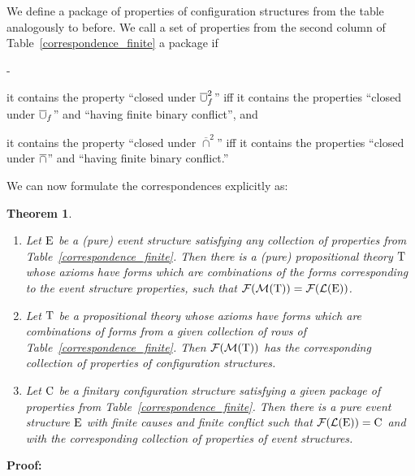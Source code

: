 \documentclass[twocolumn]{article}
\newtheorem{theo}{Theorem}
\newenvironment{theorem}[1]{\begin{theo} \rm \label{th-#1} }{\end{theo}}
\newenvironment{itemise2}{\begin{list}{{\bf --}}{\leftmargin 15pt
                        \labelwidth\leftmargini\advance\labelwidth-\labelsep
                        \topsep 2pt \itemsep 1pt \parsep 1pt}}{\end{list}}
\newcommand{\bbsmallcap}{\overline{\cap}^2}
\newcommand{\pf}{{\bf Proof:\ }}
\begin{document}
We define a package of properties of configuration structures from the 
table analogously to before. We call a set of properties from the second column of
Table~\ref{correspondence_finite} a {package }if
\begin{itemise2}
\itemsep 0pt
\item it contains the property
``closed under $\overline{\cup}_f^2$'' iff  it contains the properties
``closed under $\overline{\cup}_f$'' and ``having finite binary conflict'',
and
\item it contains the property
``closed under $\bbsmallcap$'' iff it contains the properties
``closed under $\overline{\cap}$'' and ``having finite binary conflict.''
\vspace{2pt}
\end{itemise2}
We can now formulate the correspondences explicitly as:
\begin{theorem}{finite}~
\begin{enumerate}
\item Let ${\rm E}$ be a (pure)  event structure
satisfying any collection of properties
from Table~\ref{correspondence_finite}. Then there is a (pure) propositional
theory ${\rm T}$ whose axioms
have forms which are combinations of the forms corresponding to the event structure 
properties, such that ${\cal F}({\cal M}({\rm T})) = {\cal F}({\cal L}({\rm E}))$.
\item Let ${\rm T}$ be a propositional theory whose axioms
have forms which are combinations of forms from a given collection of rows of 
Table~\ref{correspondence_finite}. Then ${\cal F}({\cal M}({\rm T}))$ has the corresponding 
collection of properties of configuration structures.
\item Let ${\rm C}$ be a finitary configuration structure satisfying a
given package of properties from Table~\ref{correspondence_finite}.
Then there is a pure event structure ${\rm E}$ with finite causes and
finite conflict such that ${\cal F}({\cal L}({\rm E})) = {\rm C}$ and with the
corresponding collection of properties of event structures.
\end{enumerate}
\end{theorem}
\pf
\end{document}
